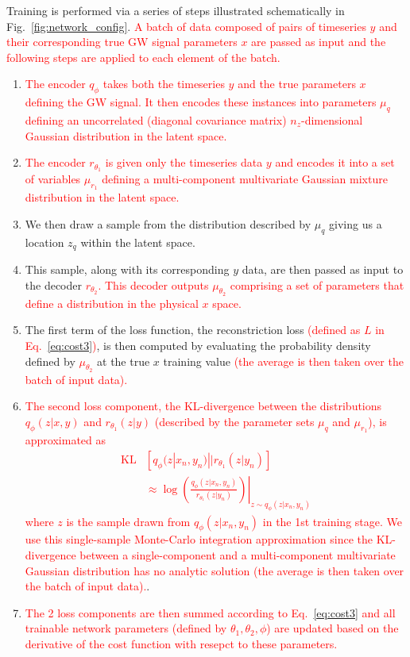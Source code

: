 \documentclass[%
showpacs,
nofootinbib,
 amsmath,amssymb,
 aps,
 twocolumn,
 prl,
 reprint,
floatfix,
]{revtex4-1}
\newcommand{\new}[1]{\textcolor{red}{#1}}
\begin{document}
%
%
Training is performed via a series of steps illustrated schematically in
Fig.~\ref{fig:network_config}. \new{A batch of data composed of pairs of
timeseries $y$ and their corresponding true \ac{GW} signal parameters $x$ are
passed as input and the following steps are applied to each element of the
batch.}
%
\begin{enumerate}
%
\item \new{The encoder $q_{\phi}$ takes both the timeseries
$y$ and the true parameters $x$ defining the \ac{GW} signal. It then encodes
these instances into parameters $\mu_{q}$ defining an uncorrelated (diagonal covariance matrix)
$n_z$-dimensional Gaussian distribution in the latent space.} 
%
\item \new{The encoder $r_{\theta_1}$ is given only the timeseries data
$y$ and encodes it into a set of variables $\mu_{r_1}$ defining a
multi-component multivariate Gaussian mixture distribution
in the latent space.}
%
\item We then draw a sample from the distribution described by $\mu_{q}$ giving us
a location $z_{q}$ within the latent space.
%
\item This sample, along with its corresponding $y$ data, are then passed
as input to the decoder \new{$r_{\theta_2}$. This decoder outputs $\mu_{\theta_2}$
comprising a set of parameters that define a distribution in the physical $x$
space.} 
\item The first term of the loss function, the reconstriction loss \new{(defined as $L$ in
Eq.~\ref{eq:cost3})}, is then computed by evaluating the probability density
defined by \new{$\mu_{\theta_2}$} at the true $x$ training value \new{(the average
is then taken over the batch of input data).} 
%
\item \new{The second loss component, the \ac{KL}-divergence between
the distributions $q_{\phi}(z|x,y)$ and $r_{\theta_1}(z|y)$ (described by
the parameter sets $\mu_{q}$ and $\mu_{r_1}$), is approximated as 
%
\begin{align}\label{eq:klgauss}
\text{KL}&\left[ q_{\phi}(z|x_{n},y_{n})||r_{\theta_{1}}(z|y_{n})\right] \\
&\approx \left.\log\left(\frac{q_{\phi}(z|x_n,y_n)}{r_{\theta_1}(z|y_n)}\right)\right|_{z\sim
q_{\phi}(z|x_n,y_n)}\nonumber
\end{align}
%
where $z$ is the sample drawn from $q_{\phi}(z|x_n,y_n)$ in the 1st
training stage. We use this single-sample Monte-Carlo integration approximation
since the \ac{KL}-divergence between a single-component and a multi-component
multivariate Gaussian distribution has no analytic solution (the average
is then taken over the batch of input data).}. 
%
\item \new{The 2 loss components are then summed according to Eq.~\ref{eq:cost3} and
all trainable network parameters (defined by $\theta_1,\theta_2,\phi$) are
updated based on the derivative of the cost function with resepct to these
parameters.}
%
\end{enumerate}
\end{document}
